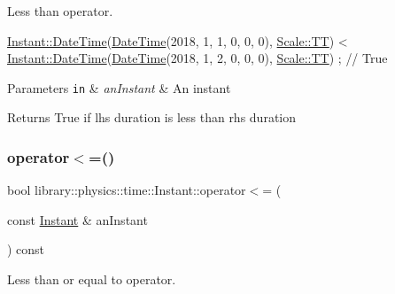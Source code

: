 Less than operator. 


\begin{DoxyCode}
\hyperlink{classlibrary_1_1physics_1_1time_1_1_instant_ac827b6ffa57ce75a3c56c462d4c872f8}{Instant::DateTime}(\hyperlink{classlibrary_1_1physics_1_1time_1_1_instant_ac827b6ffa57ce75a3c56c462d4c872f8}{DateTime}(2018, 1, 1, 0, 0, 0), 
      \hyperlink{namespacelibrary_1_1physics_1_1time_a09d2bc9fbc7b0b5f92e1419bd655e6bbadf1f3edb9115acb0a1e04209b7a9937b}{Scale::TT}) < \hyperlink{classlibrary_1_1physics_1_1time_1_1_instant_ac827b6ffa57ce75a3c56c462d4c872f8}{Instant::DateTime}(\hyperlink{classlibrary_1_1physics_1_1time_1_1_instant_ac827b6ffa57ce75a3c56c462d4c872f8}{DateTime}(2018, 1, 2, 0, 0, 0), 
      \hyperlink{namespacelibrary_1_1physics_1_1time_a09d2bc9fbc7b0b5f92e1419bd655e6bbadf1f3edb9115acb0a1e04209b7a9937b}{Scale::TT}) ; \textcolor{comment}{// True}
\end{DoxyCode}



\begin{DoxyParams}[1]{Parameters}
\mbox{\tt in}  & {\em an\+Instant} & An instant \\
\hline
\end{DoxyParams}
\begin{DoxyReturn}{Returns}
True if lhs duration is less than rhs duration 
\end{DoxyReturn}
\mbox{\label{classlibrary_1_1physics_1_1time_1_1_instant_a44bc09a2eb633bbb08b240dd886402ee}} 
\subsubsection{\texorpdfstring{operator$<$=()}{operator<=()}}
{\footnotesize\ttfamily bool library\+::physics\+::time\+::\+Instant\+::operator$<$= (\begin{DoxyParamCaption}\item[{const \hyperlink{classlibrary_1_1physics_1_1time_1_1_instant}{Instant} \&}]{an\+Instant }\end{DoxyParamCaption}) const}



Less than or equal to operator. 


